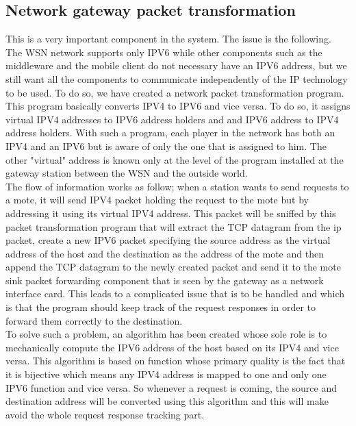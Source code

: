 \documentclass[conference]{IEEEtran}
\begin{document}
\subsection{Network gateway packet transformation}
This is a very important component in the system. The issue is the following. The WSN network supports only IPV6 while other components such as the middleware and the mobile client do not necessary have an IPV6 address, but we still want all the components to communicate independently of the IP technology to be used. To do so, we have created a network packet transformation program. This program basically converts IPV4 to IPV6 and vice versa. To do so, it assigns virtual IPV4 addresses to IPV6 address holders and and IPV6 address to IPV4 address holders. With such a program, each player in the network has both an IPV4 and an IPV6 but is aware of only the one that is assigned to him. The other "virtual" address is known only at the level of the program installed at the gateway station between the WSN and the outside world. 
\\
 The flow of information works as follow; when a station wants to send requests to a mote, it will send IPV4 packet holding the request to the mote but by addressing it using its virtual IPV4 address. This packet will be sniffed by this packet transformation program that will extract the TCP datagram from the ip packet, create a new IPV6 packet specifying the source address as the virtual address of the host and the destination as the address of the mote and then append the TCP datagram to the newly created packet and send it to the mote sink packet forwarding component that is seen by the gateway as a network interface card. This leads to a complicated issue that is to be handled and which is that the program should keep track of the request responses in order to forward them correctly to the destination. 
\\
To solve such a problem, an algorithm has been created whose sole role is to mechanically compute the IPV6 address of the host based on its IPV4 and vice versa. This algorithm is based on function whose primary quality is the fact that it is bijective which means any IPV4 address is mapped to one and only one IPV6 function and vice versa. So whenever a request is coming, the source and destination address will be converted using this algorithm and this will make avoid the whole request response tracking part.
\end{document}
